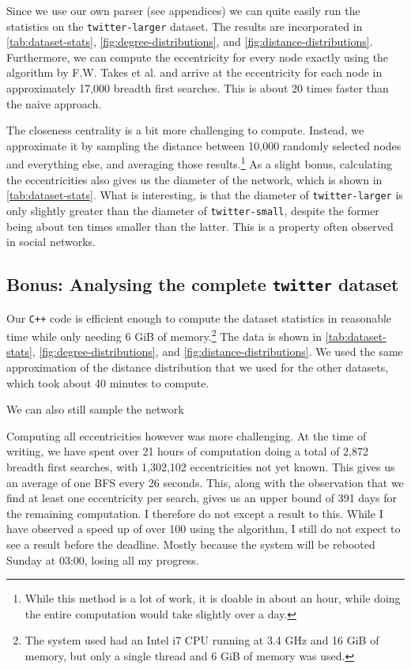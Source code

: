\documentclass[a4paper,10pt,hidelinks]{article}
\begin{document}
Since we use our own parser (see appendices) we can quite easily run the statistics on the \texttt{twitter-larger} dataset. The results are incorporated in \autoref{tab:dataset-stats}, \autoref{fig:degree-distributions}, and \autoref{fig:distance-distributions}. Furthermore, we can compute the eccentricity for every node exactly using the algorithm by F.W. Takes et al. and arrive at the eccentricity for each node in approximately 17,000 breadth first searches. This is about 20 times faster than the naive approach.

The closeness centrality is a bit more challenging to compute. Instead, we approximate it by sampling the distance between 10,000 randomly selected nodes and everything else, and averaging those results.\footnote{While this method is a lot of work, it is doable in about an hour, while doing the entire computation would take slightly over a day.} As a slight bonus, calculating the eccentricities also gives us the diameter of the network, which is shown in \autoref{tab:dataset-stats}. What is interesting, is that the diameter of \texttt{twitter-larger} is only slightly greater than the diameter of \texttt{twitter-small}, despite the former being about ten times smaller than the latter. This is a property often observed in social networks.

\subsection{Bonus: Analysing the complete \texttt{twitter} dataset}
Our \texttt{C++} code is efficient enough to compute the dataset statistics in reasonable time while only needing 6 GiB of memory.\footnote{The system used had an Intel i7 CPU running at 3.4 GHz and 16 GiB of memory, but only a single thread and 6 GiB of memory was used.} The data is shown in \autoref{tab:dataset-stats}, \autoref{fig:degree-distributions}, and \autoref{fig:distance-distributions}. We used the same approximation of the distance distribution that we used for the other datasets, which took about 40 minutes to compute.

We can also still sample the network 

Computing all eccentricities however was more challenging. At the time of writing, we have spent over 21 hours of computation doing a total of 2,872 breadth first searches, with 1,302,102 eccentricities not yet known. This gives us an average of one BFS every 26 seconds. This, along with the observation that we find at least one eccentricity per search, gives us an upper bound of 391 days for the remaining computation. I therefore do not except a result to this. While I have observed a speed up of over 100 using the algorithm, I still do not expect to see a result before the deadline. Mostly because the system will be rebooted Sunday at 03:00, losing all my progress.
\end{document}
